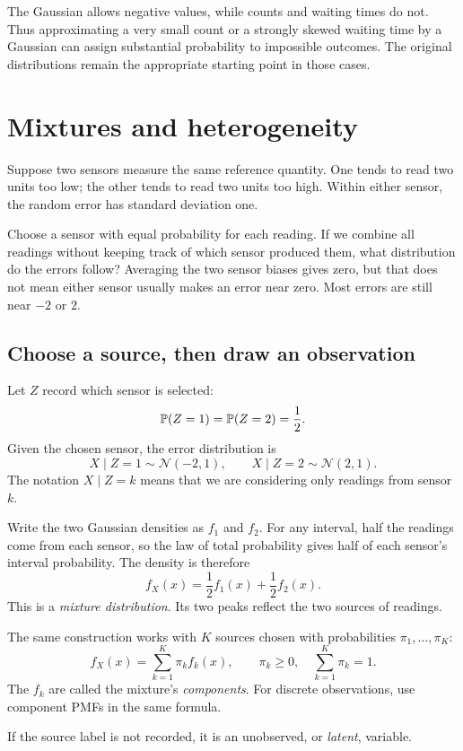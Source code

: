 The Gaussian allows negative values, while counts and waiting times do
not. Thus approximating a very small count or a strongly skewed waiting
time by a Gaussian can assign substantial probability to impossible
outcomes. The original distributions remain the appropriate starting
point in those cases.

\section{Mixtures and heterogeneity}
\label{sec:mixtures}

Suppose two sensors measure the same reference quantity. One tends to
read two units too low; the other tends to read two units too high.
Within either sensor, the random error has standard deviation one.

Choose a sensor with equal probability for each reading. If we combine
all readings without keeping track of which sensor produced them, what
distribution do the errors follow? Averaging the two sensor biases gives
zero, but that does not mean either sensor usually makes an error near
zero. Most errors are still near \(-2\) or \(2\).

\subsection{Choose a source, then draw an observation}

Let \(Z\) record which sensor is selected:
\[
  \mathbb{P}(Z=1)=\mathbb{P}(Z=2)=\frac12.
\]
Given the chosen sensor, the error distribution is
\[
  X\mid Z=1\sim\mathcal N(-2,1),\qquad
  X\mid Z=2\sim\mathcal N(2,1).
\]
The notation \(X\mid Z=k\) means that we are considering only readings
from sensor \(k\).

Write the two Gaussian densities as \(f_1\) and \(f_2\). For any interval,
half the readings come from each sensor, so the law of total probability
gives half of each sensor's interval probability. The density is therefore
\[
  f_X(x)=\frac12f_1(x)+\frac12f_2(x).
\]
This is a \emph{mixture distribution}. Its two peaks reflect the two
sources of readings.

\begin{definition}
The same construction works with \(K\) sources chosen with probabilities
\(\pi_1,\ldots,\pi_K\):
\begin{equation}
  f_X(x)=\sum_{k=1}^K\pi_k f_k(x),
  \qquad \pi_k\ge0,\quad \sum_{k=1}^K\pi_k=1.
  \label{eq:finite-mixture}
\end{equation}
The \(f_k\) are called the mixture's \emph{components}.
For discrete observations, use component PMFs in the same formula.
\end{definition}
If the source label is not recorded, it is an unobserved, or
\emph{latent}, variable.

